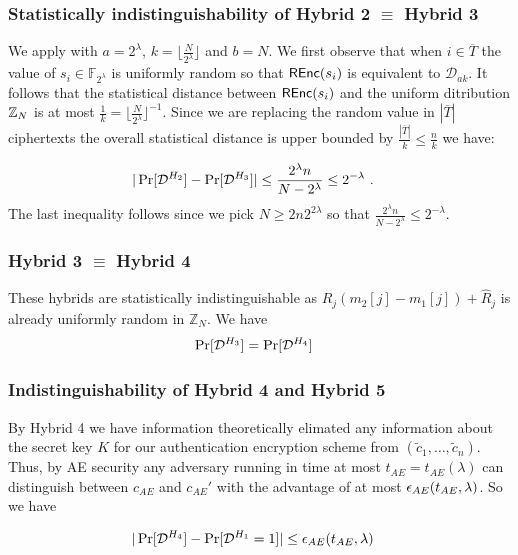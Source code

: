 \begin{proofof}{}
\subsubsection{Statistically indistinguishability of \textbf{Hybrid 2} $ \equiv $ \textbf{Hybrid 3}} We apply  with $a=2^{\lambda}$, $k = \lfloor \frac{N}{2^\lambda} \rfloor$ and $b=N$. We first observe that when $i \in \overline{T}$ the value of $s_i \in \mathbb{F}_{2^{\lambda}}$ is uniformly random so that ${\mathsf{REnc}}(s_i)$ is equivalent to $\mathcal{D}_{ak}$. It follows that the statistical distance between ${\mathsf{REnc}}(s_i)$ and the uniform ditribution $\mathbb{Z}_N$ is at most $\frac{1}{k} = \lfloor \frac{N}{2^\lambda} \rfloor^{-1}$. Since we are replacing the random value in $|\overline{T}|$ ciphertexts the overall statistical distance is upper bounded by $\frac{|\overline{T}|}{k} \leq \frac{n}{k}$  we have: 

\begin{align}
	& |\Pr[{\mathcal{D}}^{H_{2}} ] -   \Pr[{\mathcal{D}}^{H_3}]| \leq \frac{2^\lambda n}{N-2^{\lambda}} \leq 2^{-\lambda} \ . 
\end{align}
The last inequality follows since  we pick $N \geq 2n 2^{2\lambda}$ so that $\frac{2^\lambda n}{N-2^{\lambda}} \leq 2^{-\lambda}$.   


\subsubsection{\textbf{Hybrid 3} $\equiv$ \textbf{Hybrid 4}} These hybrids are statistically indistinguishable as $R_j (m_2[j]-m_1[j]) + \hat{R}_j$ is already uniformly random in $\mathbb{Z}_N$. We have 
\begin{align}
	& \Pr[{\mathcal{D}}^{H_{3}} ] = \Pr[{\mathcal{D}}^{H_4} ] 
\end{align}



\subsubsection{Indistinguishability of  \textbf{Hybrid 4} and \textbf{Hybrid 5}}  By Hybrid 4 we have information theoretically elimated any information about the secret key $K$ for our authentication encryption scheme from $(\tilde{c}_1,\ldots, \tilde{c}_n)$. Thus, by AE security any adversary running in time at most $t_{AE} = t_{AE}(\lambda)$ can distinguish between $c_{AE}$ and $c_{AE}'$ with the advantage of at most $\epsilon_{AE}(t_{AE}, \lambda)$. So we have 

	\begin{align}
	& |\Pr[{\mathcal{D}}^{H_{4}} ] -   \Pr[{\mathcal{D}}^{H_1}=1]|  \leq \epsilon_{AE}(t_{AE}, \lambda)
	\end{align}



\end{proofof}
